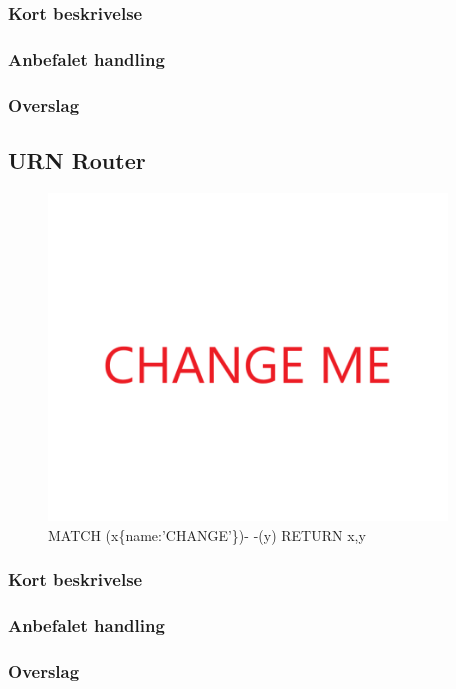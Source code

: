 \documentclass{article}
\begin{document}
\subsubsection{Kort beskrivelse}
\subsubsection{Anbefalet handling}
\subsubsection{Overslag}


\subsection{URN Router}
\begin{figure}[h]
\includegraphics[width=300pt]{CHANGE.PNG}
\caption{MATCH (x\{name:'CHANGE'\})- -(y) RETURN x,y}
\end{figure}
\subsubsection{Kort beskrivelse}
\subsubsection{Anbefalet handling}
\subsubsection{Overslag}
\end{document}
